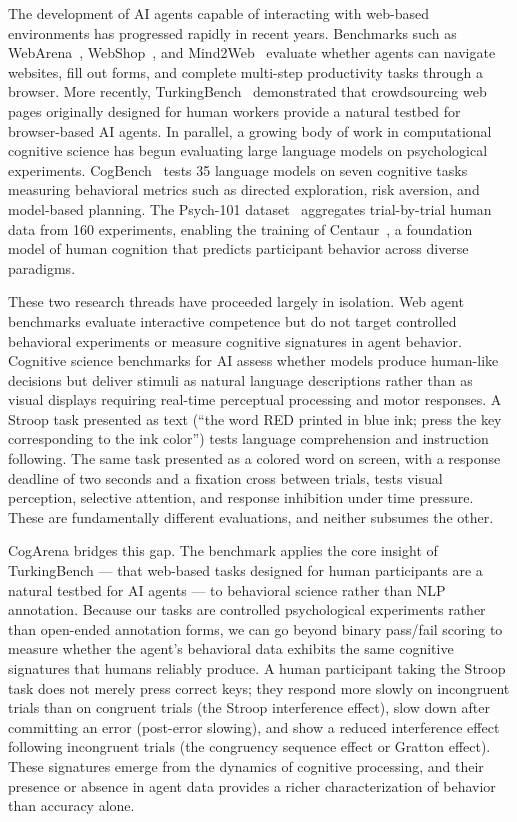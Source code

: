\documentclass{article}
\begin{document}
The development of AI agents capable of interacting with web-based environments has progressed rapidly in recent years. Benchmarks such as WebArena~\citep{zhou2024webarena}, WebShop~\citep{yao2022webshop}, and Mind2Web~\citep{deng2024mind2web} evaluate whether agents can navigate websites, fill out forms, and complete multi-step productivity tasks through a browser. More recently, TurkingBench~\citep{xu2025turkingbench} demonstrated that crowdsourcing web pages originally designed for human workers provide a natural testbed for browser-based AI agents. In parallel, a growing body of work in computational cognitive science has begun evaluating large language models on psychological experiments. CogBench~\citep{codaforno2024cogbench} tests 35 language models on seven cognitive tasks measuring behavioral metrics such as directed exploration, risk aversion, and model-based planning. The Psych-101 dataset~\citep{binz2024psych101} aggregates trial-by-trial human data from 160 experiments, enabling the training of Centaur~\citep{binz2025centaur}, a foundation model of human cognition that predicts participant behavior across diverse paradigms.

These two research threads have proceeded largely in isolation. Web agent benchmarks evaluate interactive competence but do not target controlled behavioral experiments or measure cognitive signatures in agent behavior. Cognitive science benchmarks for AI assess whether models produce human-like decisions but deliver stimuli as natural language descriptions rather than as visual displays requiring real-time perceptual processing and motor responses. A Stroop task presented as text (``the word RED printed in blue ink; press the key corresponding to the ink color'') tests language comprehension and instruction following. The same task presented as a colored word on screen, with a response deadline of two seconds and a fixation cross between trials, tests visual perception, selective attention, and response inhibition under time pressure. These are fundamentally different evaluations, and neither subsumes the other.

CogArena bridges this gap. The benchmark applies the core insight of TurkingBench --- that web-based tasks designed for human participants are a natural testbed for AI agents --- to behavioral science rather than NLP annotation. Because our tasks are controlled psychological experiments rather than open-ended annotation forms, we can go beyond binary pass/fail scoring to measure whether the agent's behavioral data exhibits the same cognitive signatures that humans reliably produce. A human participant taking the Stroop task does not merely press correct keys; they respond more slowly on incongruent trials than on congruent trials (the Stroop interference effect), slow down after committing an error (post-error slowing), and show a reduced interference effect following incongruent trials (the congruency sequence effect or Gratton effect). These signatures emerge from the dynamics of cognitive processing, and their presence or absence in agent data provides a richer characterization of behavior than accuracy alone.
\end{document}
